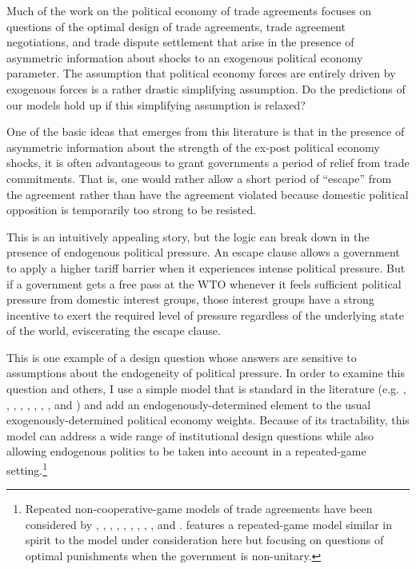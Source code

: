 Much of the work on the political economy of trade agreements focuses on questions of the optimal design of trade agreements, trade agreement negotiations, and trade dispute settlement that arise in the presence of asymmetric information about shocks to an exogenous political economy parameter. The assumption that political economy forces are entirely driven by exogenous forces is a rather drastic simplifying assumption. Do the predictions of our models hold up if this simplifying assumption is relaxed?

One of the basic ideas that emerges from this literature is that in the presence of asymmetric information about the strength of the ex-post political economy shocks, it is often advantageous to grant governments a period of relief from trade commitments. That is, one would rather allow a short period of ``escape'' from the agreement rather than have the agreement violated because domestic political opposition is temporarily too strong to be resisted.

This is an intuitively appealing story, but the logic can break down in the presence of endogenous political pressure. An escape clause allows a government to apply a higher tariff barrier when it experiences intense political pressure. But if a government gets a free pass at the WTO whenever it feels sufficient political pressure from domestic interest groups, those interest groups have a strong incentive to exert the required level of pressure regardless of the underlying state of the world, eviscerating the escape clause.

This is one example of a design question whose answers are sensitive to assumptions about the endogeneity of political pressure. In order to examine this question and others, I use a simple model that is standard in the literature (e.g. \Textcite{bs2001}, \Textcite{bown2002}, \Textcite{bown2004}, \Textcite{bs2005}, \Textcite{martinvergote}, \Textcite{bagwell2009}, \Textcite{beshkar2010a}, \Textcite{ms2012a}, and \Textcite{ms2013}) and add an endogenously-determined element to the usual exogenously-determined political economy weights. Because of its tractability, this model can address a wide range of institutional design questions while also allowing endogenous politics to be taken into account in a repeated-game setting.\footnote{Repeated non-cooperative-game models of trade agreements have been considered by \Textcite{mcm86,mcm89}, \Textcite{dixit1987}, \Textcite{bs1990, bs1997a, bs1997b, bs2002}, \Textcite{kovthurs}, \Textcite{maggi99}, \Textcite{coatesludema}, \Textcite{ederington}, \Textcite{rosendorff}, \Textcite{bagwell2009}, and \Textcite{park}. \Textcite{buzard2013a} features a repeated-game model similar in spirit to the model under consideration here but focusing on questions of optimal punishments when the government is non-unitary.}

